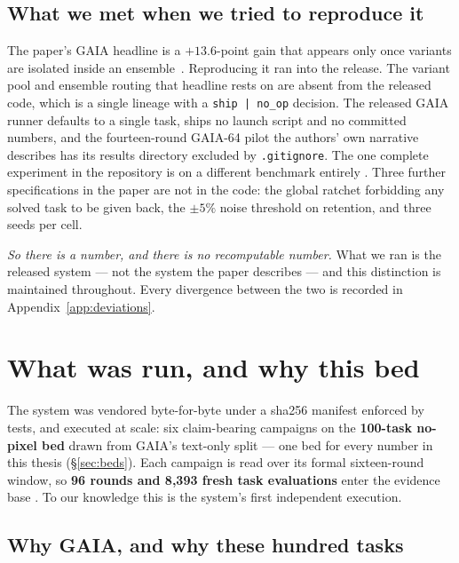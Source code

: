 \subsection*{What we met when we tried to reproduce it}

The paper's GAIA headline is a $+13.6$-point gain that appears only once
variants are isolated inside an ensemble~\cite{aegis}. Reproducing it ran
into the release. The variant pool and
ensemble routing that headline rests on are absent from the released code,
which is a single lineage with a \texttt{ship\,|\,no\_op} decision. The
released GAIA runner defaults to a single task, ships no launch script and
no committed numbers, and the fourteen-round GAIA-64 pilot the authors'
own narrative describes has its results directory excluded by
\texttt{.gitignore}. The one complete experiment in the repository is on a
different benchmark entirely . Three further specifications in the
paper are not in the code: the global ratchet forbidding any solved task to
be given back, the $\pm 5\%$ noise threshold on retention, and three seeds
per cell.

\emph{So there is a number, and there is no recomputable number.} What we
ran is the released system --- not the system the paper describes --- and
this distinction is maintained throughout. Every divergence between the two
is recorded in Appendix~\ref{app:deviations}.

\section{What was run, and why this bed}
\label{sec:what-was-run}

The system was vendored byte-for-byte under a sha256 manifest enforced by
tests, and executed at scale: six claim-bearing campaigns on the
\textbf{100-task no-pixel bed} drawn from GAIA's text-only split ---
one bed for every number in this thesis (\S\ref{sec:beds}).
Each campaign is read over its formal sixteen-round window, so
\textbf{96 rounds and 8{,}393 fresh task evaluations} enter the evidence
base . To our knowledge this is the system's first independent execution.

\subsection*{Why GAIA, and why these hundred tasks}

